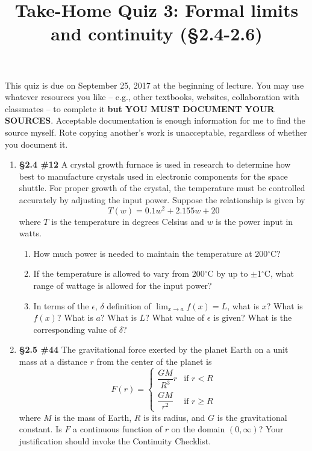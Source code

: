\documentclass[%
]{article}
\title{\vspace{-3.5pc} 
	\flushleft \bf \Large Take-Home Quiz 3: Formal limits and continuity %
	 (\S2.4-2.6)}
\date{}
\begin{document}
\maketitle

\vspace{-3pc}
 This quiz is due on September 25, 2017 at the beginning of lecture.  You may use whatever resources you like -- e.g., other textbooks, websites, collaboration with classmates -- to complete it \textbf{but YOU MUST DOCUMENT YOUR SOURCES}.  Acceptable documentation is enough information for me to find the source myself.  Rote copying another's work is unacceptable, regardless of whether you document it.  

\noindent\hrulefill

\begin{enumerate}
\item {\bf \S2.4 \#12} A crystal growth furnace is used in research to determine how best to manufacture crystals used in electronic components for the space shuttle.  For proper growth of the crystal, the temperature must be controlled accurately by adjusting the input power.  Suppose the relationship is given by 
\[
T(w)=0.1w^2+2.155w+20
\]
where $T$ is the temperature in degrees Celsius and $w$ is the power input in watts.
	\begin{enumerate}
	\item How much power is needed to maintain the temperature at 200$^{\circ}$C?
	\item If the temperature is allowed to vary from 200$^{\circ}$C by up to $\pm$1$^{\circ}$C, what range of wattage is allowed for the input power?
	\item In terms of the $\epsilon$, $\delta$ definition of $\lim_{x\to a}f(x)=L$, what is $x$?  What is $f(x)$?  What is $a$?  What is $L$?  What value of $\epsilon$ is given?  What is the corresponding value of $\delta$?  
	\end{enumerate}

\item {\bf \S2.5 \#44} The gravitational force exerted by the planet Earth on a unit mass at a distance $r$ from the center of the planet is 
\[
F(r)=\begin{cases}
	\dfrac{GM}{R^3}r & \text{if } r<R \\[1pc]
	\dfrac{GM}{r^2} & \text{if } r\geq R
	\end{cases}
\]
where $M$ is the mass of Earth, $R$ is its radius, and $G$ is the gravitational constant.  Is $F$ a continuous function of $r$ on the domain $(0,\infty)$?  Your justification should invoke the Continuity Checklist.


\end{enumerate}
\end{document}
